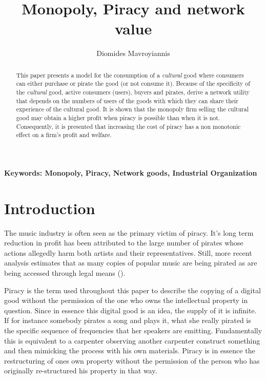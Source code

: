 \documentclass[12pt]{report}
\numberwithin{equation}{section}
\begin{document}
\title{Monopoly, Piracy and network value}
\author{Diomides Mavroyiannis}

\maketitle

\begin{abstract}
This paper presents a model for the consumption of a \textit{cultural} good where consumers can either purchase or pirate the good (or not consume it). Because of the specificity of the \textit{cultural} good, active consumers (users), buyers and pirates, derive a network utility that depends on the numbers of users of the goods with which they can share their experience of the cultural good. It is shown that the monopoly firm selling the cultural good may obtain a higher profit when piracy is possible than when it is not. Consequently, it is presented that increasing the cost of piracy has a non monotonic effect on a firm's profit and welfare.
\end{abstract}

\noindent\textbf{Keywords: Monopoly, Piracy, Network goods, Industrial Organization}

\section{Introduction}

The music industry is often seen as the primary victim of piracy. It's long term reduction in profit has been attributed to the large number of pirates whose actions allegedly harm both artists and their representatives\citep{B03}. Still, more recent analysis estimates that as many copies of popular music are being pirated as are being accessed through legal means (\citep{O15}).

\iffalse
Piracy is the term used throughout this paper to describe the copying of a digital good without the permission of the one who owns the intellectual property in question. Since in essence this digital good is an idea, the supply of it is infinite. If for instance somebody pirates a song and plays it, what she really pirated is the specific sequence of frequencies that her speakers are emitting. Fundamentally this is equivalent to a carpenter observing another carpenter construct something and then mimicking the process with his own materials. Piracy is in essence the restructuring of ones  own property without the permission of the person who has originally re-structured his property in that way.
\end{document}
